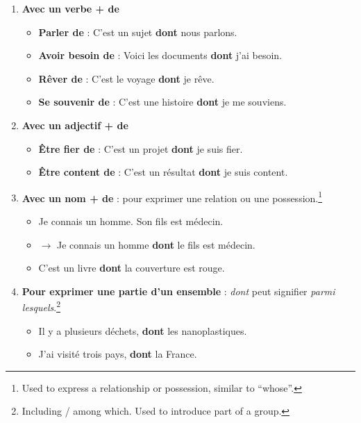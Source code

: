 \documentclass[math,code]{amznotes}
\theoremstyle{remark}
\begin{document}
\begin{enumerate}
    \item \textbf{Avec un verbe + de}
    \begin{itemize}
        \item \textbf{Parler de} : C'est un sujet \textbf{dont} nous parlons.
        \item \textbf{Avoir besoin de} : Voici les documents \textbf{dont} j'ai besoin.
        \item \textbf{Rêver de} : C'est le voyage \textbf{dont} je rêve.
        \item \textbf{Se souvenir de} : C'est une histoire \textbf{dont} je me souviens.
    \end{itemize}

    \item \textbf{Avec un adjectif + de}
    \begin{itemize}
        \item \textbf{Être fier de} : C'est un projet \textbf{dont} je suis fier.
        \item \textbf{Être content de} : C'est un résultat \textbf{dont} je suis content.
    \end{itemize}

    \item \textbf{Avec un nom + de} : pour exprimer une relation ou une possession.\footnote{Used to express a relationship or possession, similar to ``whose''.}
    \begin{itemize}
        \item Je connais un homme. Son fils est médecin.
        \item $\rightarrow$ Je connais un homme \textbf{dont} le fils est médecin.
        \item C'est un livre \textbf{dont} la couverture est rouge.
    \end{itemize}

    \item \textbf{Pour exprimer une partie d'un ensemble} : \textit{dont} peut signifier \textit{parmi lesquels}.\footnote{Including / among which. Used to introduce part of a group.}
    \begin{itemize}
        \item Il y a plusieurs déchets, \textbf{dont} les nanoplastiques.
        \item J'ai visité trois pays, \textbf{dont} la France.
    \end{itemize}
\end{enumerate}
\end{document}
